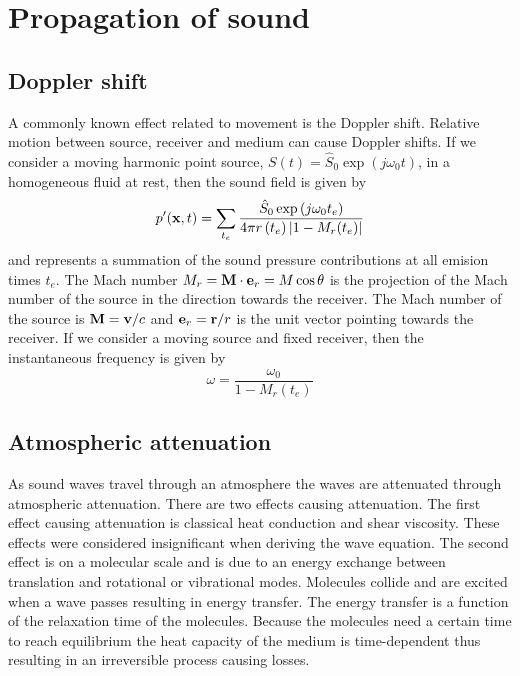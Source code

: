 \section{Propagation of sound}

\subsection{Doppler shift}
A commonly known effect related to movement is the Doppler shift.
Relative motion between source, receiver and medium can cause
Doppler shifts. If we consider a moving harmonic point source, $S(t) = \hat{S}_0
\exp{\left(j\omega_0 t\right)} $, in a homogeneous fluid at rest, then the sound
field is given by
\begin{equation}
  p'(\mathbf{x},t) = \sum_{t_e} \frac{\hat{S}_0 \exp{\left(j \omega_0 t_e\right)}}{4\pi r \left(t_e\right) \lvert1-M_r (t_e)\rvert}
\end{equation}
and represents a summation of the sound pressure contributions at all emision
times $t_e$. The Mach number $M_r = \mathbf{M} \cdot \mathbf{e}_r = M \cos{\theta}$ is
the projection of the Mach number of the source in the direction towards the
receiver. The Mach number of the source is $\mathbf{M}=\mathbf{v}/c$ and
$\mathbf{e}_r=\mathbf{r}/r$ is the unit vector pointing towards the receiver.
If we consider a moving source and fixed receiver, then the instantaneous
frequency is given by
\begin{equation}
  \omega = \frac{\omega_0}{1 - M_r(t_e)}
\end{equation}



\subsection{Atmospheric attenuation}\label{sec:theory_sound_atmospheric_attenuation}
As sound waves travel through an atmosphere the waves are attenuated through
atmospheric attenuation. There are two effects causing attenuation. The first
effect causing attenuation is classical heat conduction and shear viscosity.
These effects were considered insignificant when deriving the wave equation. The
second effect is on a molecular scale and is due to an energy exchange between
translation and rotational or vibrational modes. Molecules collide and are
excited when a wave passes resulting in energy transfer. The energy transfer is
a function of the relaxation time of the molecules. Because the molecules need a
certain time to reach equilibrium the heat capacity of the medium is
time-dependent thus resulting in an irreversible process causing losses.

